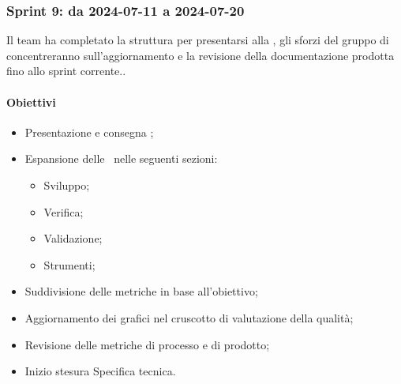 \subsubsection{Sprint 9: da 2024-07-11 a 2024-07-20}
\par Il team ha completato la struttura per presentarsi alla , gli sforzi del gruppo di concentreranno sull’aggiornamento e la revisione della documentazione prodotta fino allo sprint corrente..

\paragraph{Obiettivi}
\begin{itemize}
  \item Presentazione e consegna ;
  \item Espansione delle \NdP\ nelle seguenti sezioni:
  \begin{itemize}
    \item Sviluppo;
    \item Verifica;
    \item Validazione;
    \item Strumenti;
  \end{itemize}
  \item Suddivisione delle metriche in base all’obiettivo;
  \item Aggiornamento dei grafici nel cruscotto di valutazione della qualità;
  \item Revisione delle metriche di processo e di prodotto;
  \item Inizio stesura Specifica tecnica.
\end{itemize}

\vspace{0.5\baselineskip}
\par [Inserire Gantt]
